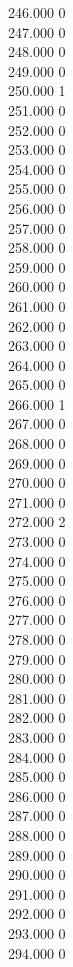 { 246.000	0 \\
 247.000	0 \\
 248.000	0 \\
 249.000	0 \\
 250.000	1 \\
 251.000	0 \\
 252.000	0 \\
 253.000	0 \\
 254.000	0 \\
 255.000	0 \\
 256.000	0 \\
 257.000	0 \\
 258.000	0 \\
 259.000	0 \\
 260.000	0 \\
 261.000	0 \\
 262.000	0 \\
 263.000	0 \\
 264.000	0 \\
 265.000	0 \\
 266.000	1 \\
 267.000	0 \\
 268.000	0 \\
 269.000	0 \\
 270.000	0 \\
 271.000	0 \\
 272.000	2 \\
 273.000	0 \\
 274.000	0 \\
 275.000	0 \\
 276.000	0 \\
 277.000	0 \\
 278.000	0 \\
 279.000	0 \\
 280.000	0 \\
 281.000	0 \\
 282.000	0 \\
 283.000	0 \\
 284.000	0 \\
 285.000	0 \\
 286.000	0 \\
 287.000	0 \\
 288.000	0 \\
 289.000	0 \\
 290.000	0 \\
 291.000	0 \\
 292.000	0 \\
 293.000	0 \\
 294.000	0 \\
}
